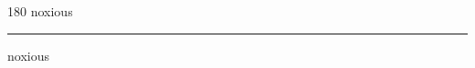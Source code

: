 
\begin{frame}
\begin{center}
\begin{turn}{180}
{\fontsize{2.5cm}{1em}\selectfont noxious}
\end{turn}
\vspace{1em}\par  
\hrule
\vspace{1em}\par  
{\fontsize{2.5cm}{1em}\selectfont noxious}
\end{center}
\end{frame}
